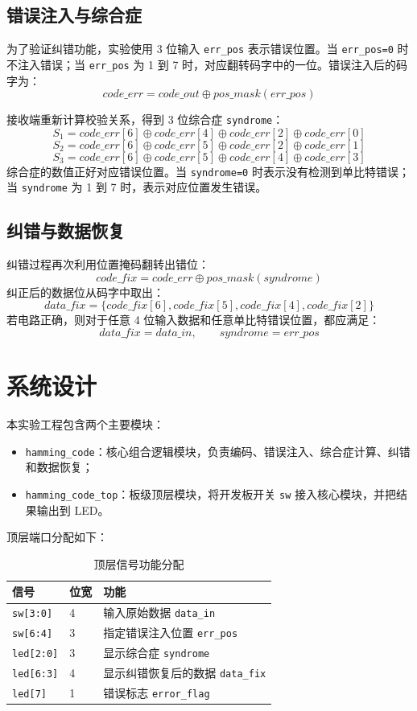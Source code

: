 ﻿\documentclass[UTF8,a4paper,12pt]{ctexart}
\begin{document}
\subsection{错误注入与综合症}

为了验证纠错功能，实验使用 3 位输入 \verb|err_pos| 表示错误位置。当 \verb|err_pos=0| 时不注入错误；当 \verb|err_pos| 为 1 到 7 时，对应翻转码字中的一位。错误注入后的码字为：
\[
code\_err = code\_out \oplus pos\_mask(err\_pos)
\]

接收端重新计算校验关系，得到 3 位综合症 \verb|syndrome|：
\[
S_1 = code\_err[6]\oplus code\_err[4]\oplus code\_err[2]\oplus code\_err[0]
\]
\[
S_2 = code\_err[6]\oplus code\_err[5]\oplus code\_err[2]\oplus code\_err[1]
\]
\[
S_3 = code\_err[6]\oplus code\_err[5]\oplus code\_err[4]\oplus code\_err[3]
\]
综合症的数值正好对应错误位置。当 \verb|syndrome=0| 时表示没有检测到单比特错误；当 \verb|syndrome| 为 1 到 7 时，表示对应位置发生错误。

\subsection{纠错与数据恢复}

纠错过程再次利用位置掩码翻转出错位：
\[
code\_fix = code\_err \oplus pos\_mask(syndrome)
\]
纠正后的数据位从码字中取出：
\[
data\_fix = \{code\_fix[6],code\_fix[5],code\_fix[4],code\_fix[2]\}
\]
若电路正确，则对于任意 4 位输入数据和任意单比特错误位置，都应满足：
\[
data\_fix = data\_in,\qquad syndrome = err\_pos
\]

\section{系统设计}

本实验工程包含两个主要模块：
\begin{itemize}
  \item \verb|hamming_code|：核心组合逻辑模块，负责编码、错误注入、综合症计算、纠错和数据恢复；
  \item \verb|hamming_code_top|：板级顶层模块，将开发板开关 \verb|sw| 接入核心模块，并把结果输出到 LED。
\end{itemize}

顶层端口分配如下：
\begin{table}[h]
  \centering
  \caption{顶层信号功能分配}
  \begin{tabular}{lll}
    \toprule
    信号 & 位宽 & 功能 \\
    \midrule
    \verb|sw[3:0]| & 4 & 输入原始数据 \verb|data_in| \\
    \verb|sw[6:4]| & 3 & 指定错误注入位置 \verb|err_pos| \\
    \verb|led[2:0]| & 3 & 显示综合症 \verb|syndrome| \\
    \verb|led[6:3]| & 4 & 显示纠错恢复后的数据 \verb|data_fix| \\
    \verb|led[7]| & 1 & 错误标志 \verb|error_flag| \\
    \bottomrule
  \end{tabular}
\end{table}
\end{document}
